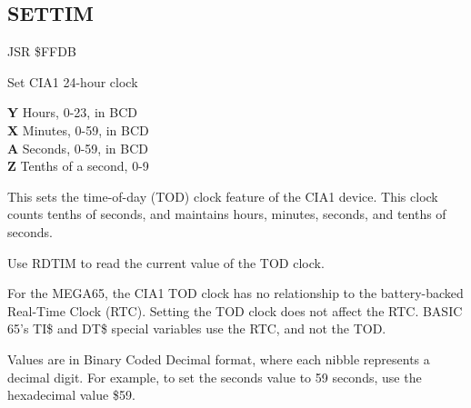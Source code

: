 \subsection{SETTIM}
\label{KERNAL Jump Table!SETTIM}
\begin{description}[leftmargin=2cm,style=nextline]
    \item [Address:] JSR \$FFDB
    \item [Description:] Set CIA1 24-hour clock
    \item [Inputs:]
        \textbf{Y} Hours, 0-23, in BCD \\
        \textbf{X} Minutes, 0-59, in BCD \\
        \textbf{A} Seconds, 0-59, in BCD \\
        \textbf{Z} Tenths of a second, 0-9
    \item [Remarks:]
        This sets the time-of-day (TOD) clock feature of the CIA1 device. This clock counts tenths of seconds, and maintains hours, minutes, seconds, and tenths of seconds.

        Use RDTIM to read the current value of the TOD clock.

        For the MEGA65, the CIA1 TOD clock has no relationship to the battery-backed Real-Time Clock (RTC). Setting the TOD clock does not affect the RTC. BASIC 65's TI\$ and DT\$ special variables use the RTC, and not the TOD.

        Values are in Binary Coded Decimal format, where each nibble represents a decimal digit. For example, to set the seconds value to 59 seconds, use the hexadecimal value \$59.
    \item [Example:]
\end{description}



\newpage
